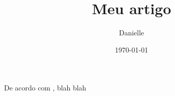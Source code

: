 \documentclass[letterpaper, 10pt]{article}
\title{Meu artigo}
\author{Danielle}
\date{\today}
\begin{document}
 
\maketitle
 
De acordo com \citet{wessberg2000real}, blah blah
 


 
\end{document}
